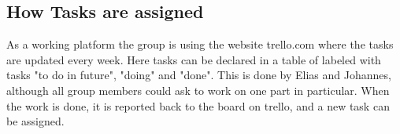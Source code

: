 \subsection {How Tasks are assigned}
As a working platform the group is using the website trello.com where the tasks are updated every week. Here tasks can be declared in a table of labeled with tasks "to do in future", "doing" and "done". This is done by Elias and Johannes, although all group members could ask to work on one part in particular. When the work is done, it is reported back to the board on trello, and a new task can be assigned.  
